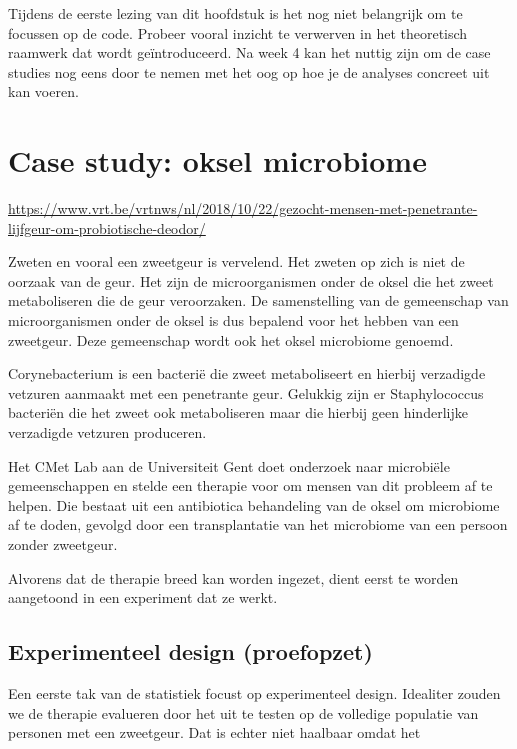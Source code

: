 \documentclass[
  12pt,dutch,coursenotes]{book}
\begin{document}
Tijdens de eerste lezing van dit hoofdstuk is het nog niet belangrijk om te focussen op de code. Probeer vooral inzicht te verwerven in het theoretisch raamwerk dat wordt geïntroduceerd. Na week 4 kan het nuttig zijn om de case studies nog eens door te nemen met het oog op hoe je de analyses concreet uit kan voeren.

\hypertarget{case-study-oksel-microbiome}{%
\section{Case study: oksel microbiome}\label{case-study-oksel-microbiome}}

\url{https://www.vrt.be/vrtnws/nl/2018/10/22/gezocht-mensen-met-penetrante-lijfgeur-om-probiotische-deodor/}

Zweten en vooral een zweetgeur is vervelend.
Het zweten op zich is niet de oorzaak van de geur.
Het zijn de microorganismen onder de oksel die het zweet metaboliseren die de geur veroorzaken.
De samenstelling van de gemeenschap van microorganismen onder de oksel is dus bepalend voor het hebben van een zweetgeur.
Deze gemeenschap wordt ook het oksel microbiome genoemd.

Corynebacterium is een bacterië die zweet metaboliseert en hierbij verzadigde vetzuren aanmaakt met een penetrante geur.
Gelukkig zijn er Staphylococcus bacteriën die het zweet ook metaboliseren maar die hierbij geen hinderlijke verzadigde vetzuren produceren.

Het CMet Lab aan de Universiteit Gent doet onderzoek naar microbiële gemeenschappen en stelde een therapie voor om mensen van dit probleem af te helpen.
Die bestaat uit een antibiotica behandeling van de oksel om microbiome af te doden,
gevolgd door een transplantatie van het microbiome van een persoon zonder zweetgeur.

Alvorens dat de therapie breed kan worden ingezet, dient eerst te worden aangetoond in een experiment dat ze werkt.

\hypertarget{experimenteel-design-proefopzet}{%
\subsection{Experimenteel design (proefopzet)}\label{experimenteel-design-proefopzet}}

Een eerste tak van de statistiek focust op experimenteel design.
Idealiter zouden we de therapie evalueren door het uit te testen op de volledige populatie van personen met een zweetgeur.
Dat is echter niet haalbaar omdat het
\end{document}
